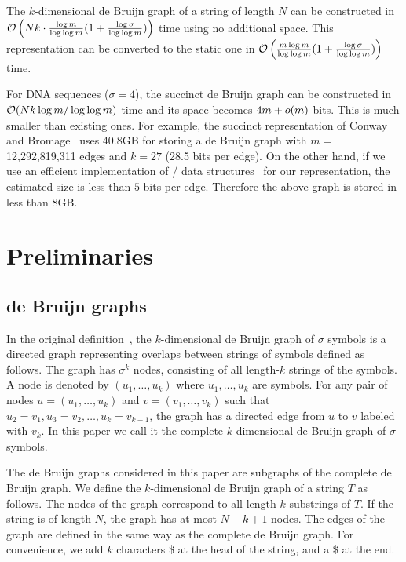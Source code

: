 \begin{theorem}
The $k$-dimensional de Bruijn graph of a string of length $N$
can be constructed in $\mathcal{O}\left(Nk \cdot \frac{\log m}{\log \log m}
(1+\frac{\log\sigma}{\log\log m})\right)$ time using no additional space.
This representation can be converted to the static one in 
$\mathcal{O}\left(\frac{m\log m}{\log \log m}
(1+\frac{\log\sigma}{\log\log m})\right)$ time.
\end{theorem}
For DNA sequences ($\sigma=4$), the succinct de Bruijn graph can be constructed in 
$\mathcal{O}(Nk \log m/\log\log m)$ time and its space becomes $4m + o(m)$ bits.
This is much smaller than existing ones.
For example, the succinct representation of Conway and Bromage~\cite{conway}
uses 40.8GB for storing a de Bruijn graph with $m = $ 12,292,819,311 edges
and $k = 27$ (28.5 bits per edge).  
On the other hand, if we use an efficient implementation
of {\rank}/{\select} data structures~\cite{bitvector} for our representation,
the estimated size is less than $5$ bits per edge.  
Therefore the above graph is stored in less than 8GB.
\emergencystretch=20pt\par



\section{Preliminaries}\label{p1-sec:preliminaries}

\subsection{de Bruijn graphs}
In the original definition~\cite{deBruijn46}, the $k$-dimensional de Bruijn graph of $\sigma$ symbols
is a directed graph representing overlaps between strings of symbols defined as follows.
The graph has $\sigma^k$ nodes, consisting of all length-$k$ strings of the symbols.
A node is denoted by $(u_1,\ldots,u_k)$ where $u_1,\ldots,u_k$ are symbols.
For any pair of nodes $u = (u_1,\ldots,u_k)$ and $v = (v_1,\ldots,v_k)$ 
such that 
$u_2 = v_1, u_3 = v_2, \ldots, u_k = v_{k-1}$, the graph has a directed
edge from $u$ to $v$ labeled with $v_k$.
In this paper we call it the complete $k$-dimensional de Bruijn graph
of $\sigma$ symbols.

The de Bruijn graphs considered in this paper are subgraphs of the complete de Bruijn graph.
We define the $k$-dimensional de Bruijn graph of a string $T$ as follows.
The nodes of the graph correspond to all length-$k$ substrings of $T$.  If the string is of length $N$,
the graph has at most $N-k+1$ nodes.  The edges of the graph are defined in the same way as the complete
de Bruijn graph.  For convenience, we add $k$ characters \$ at the head of the string,
and a \$ at the end.

